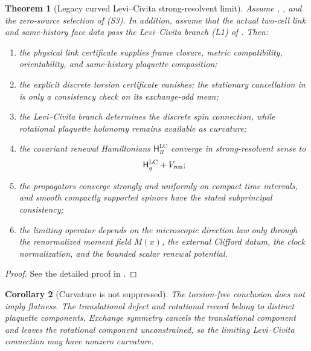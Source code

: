 \documentclass[11pt]{article}
\newtheorem{theorem}{Theorem}[section]
\newtheorem{corollary}[theorem]{Corollary}
\theoremstyle{definition}
\theoremstyle{remark}
\newcommand{\Ham}{\mathsf H}
\newcommand{\LC}{\mathrm{LC}}
\begin{document}
\begin{theorem}[Legacy curved Levi--Civita strong-resolvent limit]
\label{thm:curved-limit}
Assume , , and the zero-source
selection of \textup{(S3)}.  In addition, assume that the
actual two-cell link and same-history face data pass the Levi--Civita branch
\textup{(L1)} of .  Then:
\begin{enumerate}[label=\textup{(\roman*)},leftmargin=2.7em]
\item the physical link certificate supplies frame closure, metric
      compatibility, orientability, and same-history plaquette composition;
\item the explicit discrete torsion certificate vanishes; the stationary
      cancellation in  is only a consistency
      check on its exchange-odd mean;
\item the Levi--Civita branch determines the discrete spin connection, while
      rotational plaquette holonomy remains available as curvature;
\item the covariant renewal Hamiltonians $\Ham_R^{\LC}$ converge in
      strong-resolvent sense to
      \[
        \Ham_g^{\LC}+V_{\rm ren};
      \]
\item the propagators converge strongly and uniformly on compact time
      intervals, and smooth compactly supported spinors have the stated
      subprincipal consistency;
\item the limiting operator depends on the microscopic direction law only
      through the renormalized moment field $M(x)$, the external Clifford datum,
      the clock normalization, and the bounded scalar renewal potential.
\end{enumerate}
\end{theorem}

\begin{proof}
See the detailed proof in .
\end{proof}

\begin{corollary}[Curvature is not suppressed]
\label{cor:curvature-survives}
The torsion-free conclusion does not imply flatness.  The translational defect
and rotational record belong to distinct plaquette components.  Exchange
symmetry cancels the translational component and leaves the rotational component unconstrained, so the limiting
Levi--Civita connection may have nonzero curvature.
\end{corollary}
\end{document}
